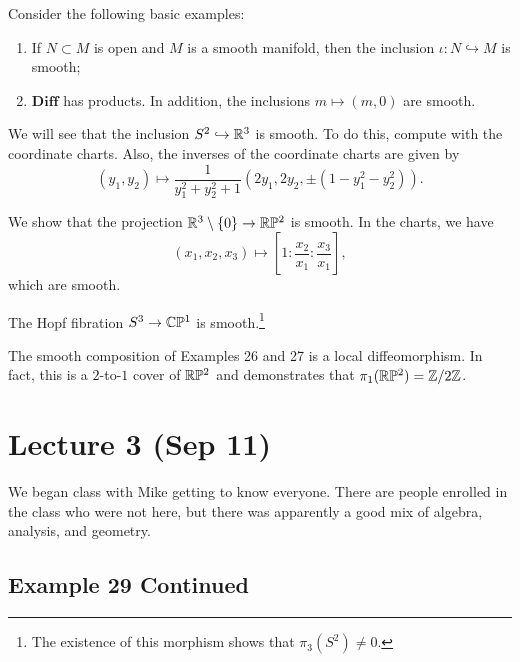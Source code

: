 \documentclass[twoside, 10pt]{article}
\begin{document}
    \begin{exm}
        Consider the following basic examples:
        \begin{enumerate}
            \item If $N \subset M$ is open and $M$ is a smooth manifold, then the inclusion $\iota:N \hookrightarrow M$ is smooth;
            \item $\mathbf{Diff}$ has products. In addition, the inclusions $m \mapsto (m,0)$ are smooth.
        \end{enumerate}
    \end{exm}

    \begin{exm}
        We will see that the inclusion $S^2 \hookrightarrow \mathbb{R}^3$ is smooth. To do this, compute with the coordinate charts. Also, the inverses of the coordinate charts are given by 
        \[ (y_1, y_2) \mapsto \frac{1}{y_1^2+y_2^2+1} (2y_1, 2y_2, \pm(1-y_1^2-y_2^2)).\]
    \end{exm}

    \begin{exm}
        We show that the projection $\mathbb{R}^3 \setminus \{0\} \to \mathbb{R}\mathbb{P}^2$ is smooth. In the charts, we have 
        \[(x_1, x_2, x_3) \mapsto \left[ 1: \frac{x_2}{x_1} : \frac{x_3}{x_1} \right], \] which are smooth.
    \end{exm}

    \begin{exm}
        The Hopf fibration $S^3 \to \mathbb{C}\mathbb{P}^1$ is smooth.\footnote{The existence of this morphism shows that $\pi_3(S^2) \neq 0$.}
    \end{exm}

    \begin{exm}
        The smooth composition of Examples 26 and 27 is a local diffeomorphism. In fact, this is a $2$-to-$1$ cover of $\mathbb{R}\mathbb{P}^2$ and demonstrates that $\pi_1(\mathbb{R}\mathbb{P}^2) = \mathbb{Z}/2\mathbb{Z}$.
    \end{exm}

    \section{Lecture 3 (Sep 11)}%
    \label{sec:lecture_3_sep_11_}

    We began class with Mike getting to know everyone. There are people enrolled in the class who were not here, but there was apparently a good mix of algebra, analysis, and geometry.

    \subsection{Example 29 Continued}%
    \label{sub:example_29_continued}
    
\end{document}
